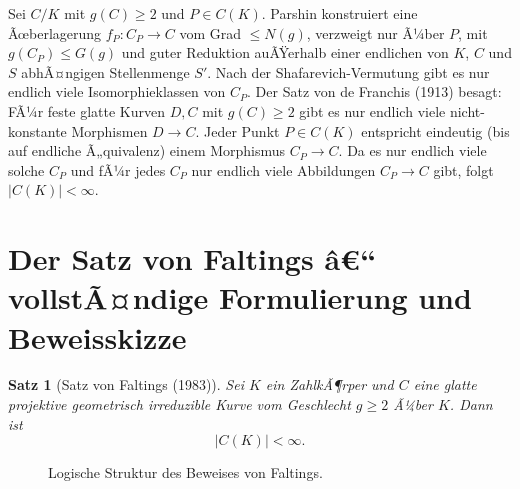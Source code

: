 ﻿\documentclass[12pt,a4paper]{article}
\theoremstyle{plain}
\newtheorem{theorem}{Satz}[section]
\theoremstyle{definition}
\theoremstyle{remark}
\newenvironment{proof*}[1][Beweis]{%
  \begin{proof}[#1]\renewcommand{\qedsymbol}{$\blacksquare$}}
  {\end{proof}}
\begin{document}
\begin{proof*}
Sei $C/K$ mit $g(C) \geq 2$ und $P \in C(K)$.
Parshin konstruiert eine Ãœberlagerung $f_P: C_P \to C$ vom Grad $\leq N(g)$,
verzweigt nur Ã¼ber $P$, mit $g(C_P) \leq G(g)$ und
guter Reduktion auÃŸerhalb einer endlichen von $K$, $C$ und $S$
abhÃ¤ngigen Stellenmenge $S'$.
Nach der Shafarevich-Vermutung gibt es nur endlich viele Isomorphieklassen von $C_P$.
Der Satz von de Franchis (1913) besagt: FÃ¼r feste glatte Kurven $D, C$ mit $g(C) \geq 2$
gibt es nur endlich viele nicht-konstante Morphismen $D \to C$.
Jeder Punkt $P \in C(K)$ entspricht eindeutig (bis auf endliche Ã„quivalenz)
einem Morphismus $C_P \to C$. Da es nur endlich viele solche $C_P$ und
fÃ¼r jedes $C_P$ nur endlich viele Abbildungen $C_P \to C$ gibt,
folgt $|C(K)| < \infty$.
\end{proof*}

\section{Der Satz von Faltings â€“ vollstÃ¤ndige Formulierung und Beweisskizze}

\begin{theorem}[Satz von Faltings (1983)]\label{thm:faltings}
Sei $K$ ein ZahlkÃ¶rper und $C$ eine glatte projektive geometrisch irreduzible Kurve
vom Geschlecht $g \geq 2$ Ã¼ber $K$. Dann ist
\[
  \boxed{|C(K)| < \infty.}
\]
\end{theorem}

\begin{figure}[H]
\centering
{}
\caption{Logische Struktur des Beweises von Faltings.}
\label{fig:beweis_struktur}
\end{figure}
\end{document}
